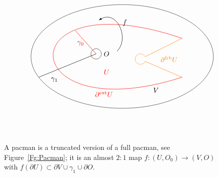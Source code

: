\documentclass[]{amsart}
\newcommand\ext{{\operatorname{ext}}}
\newcommand\frb{{\operatorname{frb}}}
\theoremstyle{remark}
\numberwithin{equation}{section}
\theoremstyle{definition}
\begin{document}
\begin{figure}[t!]
\[\begin{tikzpicture}[scale=1.3]

\coordinate  (w0) at (-3.9,1.5);

\draw (w0) circle (0.2cm);
\draw (-3.5,1.5) node {$O$};


\node (v0) at (-2.9,1.4)  {};

\draw  (v0) ellipse (3.5 and 2);







\coordinate (v1) at (-2.2,1.3) {};
\coordinate (v1a) at (-2.02,1.39) {};
\coordinate (v1b) at (-2.02,1.21) {};

\coordinate (v2) at (-0.6,2.1) {} {};
\coordinate (v3) at (-0.6,0.6) {} {};

  \draw[ line width=0.5pt,orange] 
            (v3) 
            .. controls (v3) and (v1b) ..
            (v1b);
    \draw[orange, line width=0.5pt]           
            (v1a).. controls (v1a) and (v2)..(v2);
    \draw[line width=0.5pt,red]  
            (v2)
            .. controls (-7.3,4.4) and (-7.1,-1.5) ..
            (v3);
            

\draw [orange, shift={(-2.2,1.3)}, scale=0.2] plot[domain=-2.74468443448354:2.6325217651674095,variable=\t]({-1.*1.0089598604503545*cos(\t r)+0.*1.0089598604503545*sin(\t r)},{-0.*1.0089598604503545*cos(\t r)+1.*1.0089598604503545*sin(\t r)});


\coordinate (w1) at (-4.7,2.4) {} {};

\draw[line width=0.5pt,red]  (w0)--(w1);

\coordinate (w2) at (-6.1,0.6)  {};
\draw  [line width=0.5pt]  (w0)--(w2);

\draw[line  width=0.5pt,-latex] (-3.1,1.6) .. controls (-2.6,2.1) and (-3.1,3.2) .. (-3.8,2.8);

\node at (-5.5,0.5) {$\gamma_1$};
\node at (-2.8,2.7) {$f$};
\node[red] at (-4.5,1.9) {$\gamma_0$};

\node at (-1.9,4.6) {};
\node[red] at (-3.5,0.8) {$U$};
\node at (-1.6,0.1) {$V$};
\node[red] at (-3.6,-0.05) {$\partial ^\ext U$};
\node[orange] at (-1.1,1.3) {$\partial ^\frb U$};
\end{tikzpicture}\]
\caption{A pacman is a truncated version of a full pacman, see Figure~\ref{Fg:Pacman}; it is an almost $2:1$ map $f:(U,O_0)\to (V,O)$ with $f(\partial U)\subset \partial V\cup \gamma_1\cup \partial O$.}
\label{Fg:TruncPacman}
\end{figure}
\end{document}
